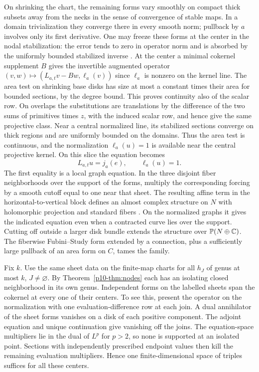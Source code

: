 On shrinking the chart, the remaining forms vary smoothly on compact
thick subsets away from the necks in the sense of convergence of
stable maps. In a domain trivialization they converge there in every
smooth norm; pullback by $a$ involves only its first derivative.
One may freeze these forms at the center in the nodal stabilization:
the error tends to zero in operator norm and is absorbed by the
uniformly bounded stabilized inverse
\cite[Propositions~B.7.9 and~B.10.4]{pardonatlas}. At the center a minimal cokernel
supplement $B$ gives the invertible augmented operator
$(v,w)\mapsto(L_{a,t}v-Bw,\ell_a(v))$ since $\ell_a$ is nonzero on
the kernel line. The area test on shrinking base disks has size at
most a constant times their area for bounded sections, by the
degree bound. This proves continuity also of the scalar row. On
overlaps the substitutions are translations by the difference of
the two sums of primitives times $z$, with the induced scalar row,
and hence give the same projective class. Near a central normalized line, its stabilized sections
converge on thick regions and are uniformly bounded on the domains.
Thus the area test is continuous, and the normalization $\ell_a(u)=1$
is available near the central projective kernel. On this slice the
equation becomes
\begin{equation}\label{p10-eq:desc-affine}
                  L_{a,t}u=j_a(e),\qquad \ell_a(u)=1 .
\end{equation}
The first equality is a local graph equation. In the three disjoint
fiber neighborhoods over the support of the forms, multiply the
corresponding forcing by a smooth cutoff equal to one near that
sheet. The resulting affine term in the horizontal-to-vertical
block defines an almost complex structure on $N$ with holomorphic
projection and standard fibers \cite[Lemma~5.9]{bai}. On the
normalized graphs it gives the indicated equation even when a
contracted curve lies over the support. Cutting off outside a larger
disk bundle extends the structure over $\mathbb P(N\oplus\mathbb C)$.
The fiberwise Fubini--Study form extended by a connection, plus a
sufficiently large pullback of an area form on $C$, tames the family.

Fix $k$. Use the same sheet data on the finite-map charts for all
$h_J$ of genus at most $k$, $J\ne\varnothing$. By
Theorem~\ref{p10-thm:nodes} each has an isolating closed neighborhood in
its own genus. Independent forms on the labelled sheets span the
cokernel at every one of their centers. To see this, present the
operator on the normalization with one evaluation-difference row
at each join. A dual annihilator of the sheet forms vanishes on
a disk of each positive component. The adjoint equation and unique
continuation give vanishing off the joins. The equation-space
multipliers lie in the dual of $L^p$ for $p>2$, so none is supported
at an isolated point. Sections with independently prescribed endpoint
values then kill the remaining evaluation multipliers. Hence one
finite-dimensional space of triples suffices for all these centers.

